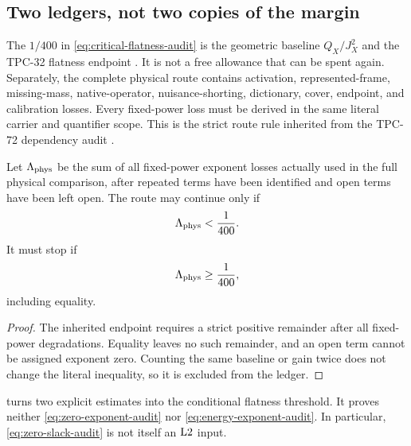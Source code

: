 \subsection{Two ledgers, not two copies of the margin}

The \(1/400\) in \eqref{eq:critical-flatness-audit} is the geometric
baseline \(Q_X/J_X^2\) and the TPC-32 flatness endpoint
\citep{WangTPC32}.  It is not a free allowance that can be spent
again.  Separately, the complete physical route contains activation,
represented-frame, missing-mass, native-operator, nuisance-shorting,
dictionary, cover, endpoint, and calibration losses.  Every
fixed-power loss must be derived in the same literal carrier and
quantifier scope.  This is the strict route rule inherited from the
TPC-72 dependency audit \citep{WangTPC72}.

\begin{proposition}
\label{prop:strict-loss-rule}
Let \(\Lambda_{\rm phys}\) be the sum of all fixed-power exponent
losses actually used in the full physical comparison, after repeated
terms have been identified and open terms have been left open.  The
route may continue only if
\begin{equation}
 \Lambda_{\rm phys}<\frac1{400}.
\label{eq:strict-physical-loss}
\end{equation}
It must stop if
\begin{equation}
 \Lambda_{\rm phys}\ge\frac1{400},
\label{eq:physical-stop}
\end{equation}
including equality.
\end{proposition}

\begin{proof}
The inherited endpoint requires a strict positive remainder after
all fixed-power degradations.  Equality leaves no such remainder, and
an open term cannot be assigned exponent zero.  Counting the same
baseline or gain twice does not change the literal inequality, so it
is excluded from the ledger.
\end{proof}

\begin{remark}
 turns two explicit estimates into the
conditional flatness threshold.  It proves neither
\eqref{eq:zero-exponent-audit} nor
\eqref{eq:energy-exponent-audit}.  In particular,
\eqref{eq:zero-slack-audit} is not itself an \(\mathrm{L2}\) input.
\end{remark}
